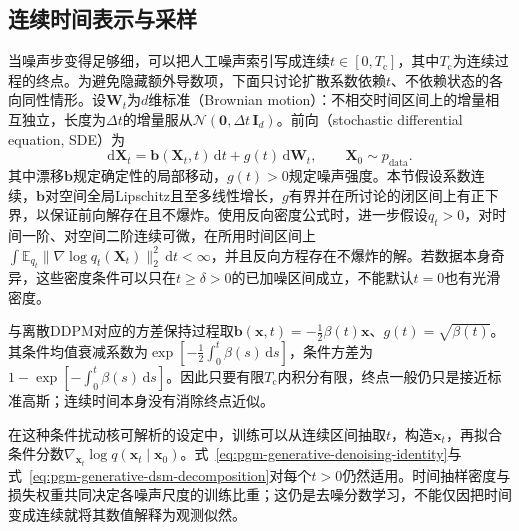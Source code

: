 \subsection{连续时间表示与采样}
\label{sec:pgm-generative-continuous-diffusion}

当噪声步变得足够细，可以把人工噪声索引写成连续$t\in[0,T_{\mathrm{c}}]$，其中$T_{\mathrm{c}}$为连续过程的终点。为避免隐藏额外导数项，下面只讨论扩散系数依赖$t$、不依赖状态的各向同性情形。设$\bm{W}_t$为$d$维标准（Brownian motion）：不相交时间区间上的增量相互独立，长度为$\Delta t$的增量服从$\mathcal{N}(\bm{0},\Delta t\,\bm{I}_d)$。前向（stochastic differential equation, SDE）为
\begin{equation}
  \label{eq:pgm-generative-forward-sde}
  \mathrm{d}\bm{X}_t
  =\bm{b}(\bm{X}_t,t)\,\mathrm{d}t
    +g(t)\,\mathrm{d}\bm{W}_t,
  \qquad \bm{X}_0\sim p_{\mathrm{data}}.
\end{equation}
其中漂移$\bm{b}$规定确定性的局部移动，$g(t)>0$规定噪声强度。本节假设系数连续，$\bm{b}$对空间全局Lipschitz且至多线性增长，$g$有界并在所讨论的闭区间上有正下界，以保证前向解存在且不爆炸。使用反向密度公式时，进一步假设$q_t>0$，对时间一阶、对空间二阶连续可微，在所用时间区间上$\int\mathbb{E}_{q_t}\lVert\nabla\log q_t(\bm{X}_t)\rVert_2^2\,\mathrm{d}t<\infty$，并且反向方程存在不爆炸的解。若数据本身奇异，这些密度条件可以只在$t\geq\delta>0$的已加噪区间成立，不能默认$t=0$也有光滑密度。

与离散DDPM对应的方差保持过程取$\bm{b}(\bm{x},t)=-\tfrac12\beta(t)\bm{x}$、$g(t)=\sqrt{\beta(t)}$。其条件均值衰减系数为$\exp[-\tfrac12\int_0^t\beta(s)\,\mathrm{d}s]$，条件方差为$1-\exp[-\int_0^t\beta(s)\,\mathrm{d}s]$。因此只要有限$T_{\mathrm{c}}$内积分有限，终点一般仍只是接近标准高斯；连续时间本身没有消除终点近似。

在这种条件扰动核可解析的设定中，训练可以从连续区间抽取$t$，构造$\bm{x}_t$，再拟合条件分数$\nabla_{\bm{x}_t}\log q(\bm{x}_t\mid\bm{x}_0)$。式~\eqref{eq:pgm-generative-denoising-identity}与式~\eqref{eq:pgm-generative-dsm-decomposition}对每个$t>0$仍然适用。时间抽样密度与损失权重共同决定各噪声尺度的训练比重；这仍是去噪分数学习，不能仅因把时间变成连续就将其数值解释为观测似然。

